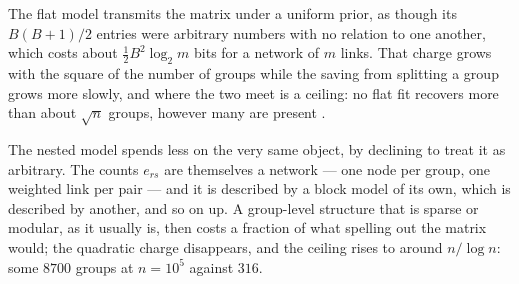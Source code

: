 The flat model transmits the matrix under a uniform prior, as though its
$B(B+1)/2$ entries were arbitrary numbers with no relation to one another, which
costs about $\tfrac12B^2\log_2 m$ bits for a network of $m$ links. That charge
grows with the square of the number of groups while the saving from splitting a
group grows more slowly, and where the two meet is a ceiling: no flat fit
recovers more than about $\sqrt n$ groups, however many are present
\citep{peixoto2014hier}.

The nested model spends less on the very same object, by declining to treat it as
arbitrary. The counts $e_{rs}$ are themselves a network --- one node per group,
one weighted link per pair --- and it is described by a block model of its own,
which is described by another, and so on up. A group-level structure that is
sparse or modular, as it usually is, then costs a fraction of what spelling out
the matrix would; the quadratic charge disappears, and the ceiling rises to around
$n/\log n$: some $8700$ groups at $n=10^5$ against $316$.

